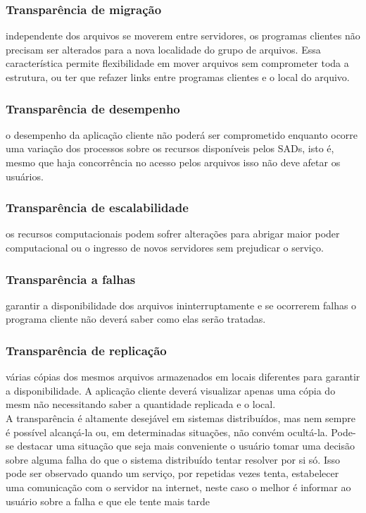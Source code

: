 	\subsubsection{Transparência de migração} independente dos arquivos se moverem entre servidores, os programas clientes não precisam ser alterados para a nova localidade do grupo de arquivos. Essa característica permite flexibilidade em mover arquivos sem comprometer toda a estrutura, ou ter que refazer links entre programas clientes e o local do arquivo.
	
	\subsubsection{Transparência de desempenho} o desempenho da aplicação cliente não poderá ser comprometido enquanto ocorre uma variação dos processos sobre os recursos disponíveis pelos SADs, isto é, mesmo que haja concorrência no acesso pelos arquivos isso não deve afetar os usuários.
	
	\subsubsection{Transparência de escalabilidade} os recursos computacionais podem sofrer alterações para abrigar maior poder computacional ou o ingresso de novos servidores sem prejudicar o serviço.
	
	\subsubsection{Transparência a falhas} garantir a disponibilidade dos arquivos ininterruptamente e se ocorrerem falhas o programa cliente não deverá saber como elas serão tratadas.
	
	\subsubsection{Transparência de replicação} várias cópias dos mesmos arquivos armazenados em locais diferentes para garantir a disponibilidade. A aplicação cliente deverá
	visualizar apenas uma cópia do mesm não necessitando saber a quantidade replicada e o local.
	\\
	
	A transparência é altamente desejável em sistemas distribuídos, mas nem sempre é possível alcançá-la ou, em determinadas situações, não convém ocultá-la. Pode-se destacar uma situação que seja mais conveniente o usuário tomar uma decisão sobre
	alguma falha do que o sistema distribuído tentar resolver por si só. Isso pode ser observado quando um serviço, por repetidas vezes tenta, estabelecer uma comunicação com o servidor na internet, neste caso o melhor é informar ao usuário sobre a falha e que ele tente mais tarde
	

